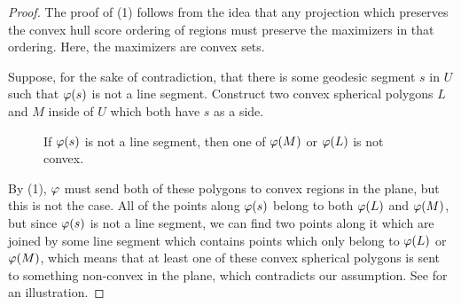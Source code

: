 \begin{proof}



		The proof of (1) follows from the idea that any projection which preserves the convex hull score ordering of regions must 
		preserve the maximizers in that ordering.   Here, the maximizers are convex sets.
		
		 Suppose, for the sake of contradiction, that there is some geodesic segment $s$ in $U$ such that $\varphi(s)$ is not a line segment. Construct two convex spherical polygons $L$ and $M$ inside of $U$ which both have $s$ as a side. 




\ifsmallfigs
\begin{figure}
	\centering
	\begin{minipage}{.5\textwidth}
		\centering
	\resizebox{.95\textwidth}{!}{}	
	\label{fig:ch_schema}
	\end{minipage}%
	\begin{minipage}{.5\textwidth}
		\centering
		\resizebox{1.15\textwidth}{!}{}
\label{fig:lineconvexcont}
	\end{minipage}
\end{figure}
\fi





		
\ifsmallfigs
\else		
\begin{figure}[h]
	\centering
	
	\caption{If $\varphi(s)$ is not a line segment, then one of $\varphi(M)$ or $\varphi(L)$ is not convex.}
	\label{fig:lineconvexcont}
\end{figure}
\fi
		 By (1), $\varphi$ must send both of these polygons to convex regions in the plane, but this is not the case.  All of the points along $\varphi(s)$ belong to both $\varphi(L)$ and $\varphi(M)$, but since $\varphi(s)$ is not a line segment, we can find two points along it which are joined by some line segment which contains points which only belong to $\varphi(L)$ or $\varphi(M)$, which means that at least one of these convex spherical polygons is sent to something non-convex in the plane, which contradicts our assumption.		See  for an illustration.
		

\end{proof}
